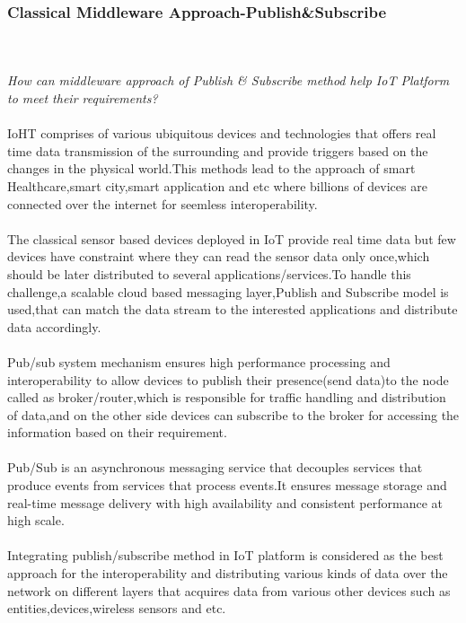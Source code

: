 \subsubsection{Classical Middleware Approach-Publish\&Subscribe}
\hfill\\
\hfill\\
\emph{How can middleware approach of Publish \& Subscribe method help IoT Platform to meet their requirements?}\\ \\
IoHT comprises of various ubiquitous devices and technologies that offers real time data transmission of the surrounding and provide triggers based on the changes in the physical world.This methods lead to the approach of smart Healthcare,smart city,smart application and etc where billions of devices are connected over the internet for seemless interoperability.\\ \\
The classical sensor based devices deployed in IoT provide real time data but few devices have constraint where they can read the sensor data only once,which should be later distributed to several applications/services.To handle this challenge,a scalable cloud based messaging layer\cite{happ2017meeting},Publish and Subscribe model is used,that can match the data stream to the interested applications and distribute data accordingly.\\ \\
Pub/sub system mechanism ensures high performance processing and interoperability to allow devices to publish their presence(send data)to the node called as broker/router,which is responsible for traffic handling and distribution of data,and on the other side devices can subscribe to the broker for accessing the information based on their requirement.\\ \\
Pub/Sub is an asynchronous messaging service that decouples services that produce events from services that process events.It ensures message storage and real-time message delivery with high availability and consistent performance at high scale\cite{6}.\\ \\
Integrating publish/subscribe method in IoT platform is considered as the best approach for the interoperability and 
distributing various kinds of data over the network on different layers that acquires data from various other devices such as entities,devices,wireless sensors and etc.\\

